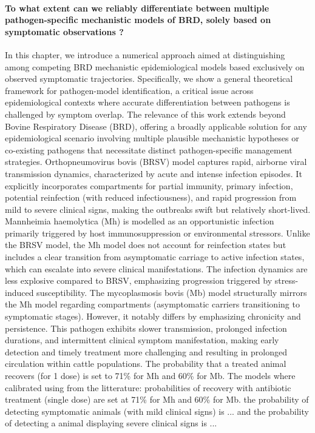 \paragraph{To what extent can we reliably differentiate between multiple pathogen-specific mechanistic models of BRD, solely based on symptomatic observations ?} In this chapter, we introduce a numerical approach aimed at distinguishing among competing BRD mechanistic epidemiological models \cite{sorindupont_modeling_2023} based exclusively on observed symptomatic trajectories. Specifically, we show a general theoretical framework for pathogen-model identification, a critical issue across epidemiological contexts where accurate differentiation between pathogens is challenged by symptom overlap. The relevance of this work extends beyond Bovine Respiratory Disease (BRD), offering a broadly applicable solution for any epidemiological scenario involving multiple plausible mechanistic hypotheses or co-existing pathogens that necessitate distinct pathogen-specific management strategies. Orthopneumovirus bovis (BRSV) model captures rapid, airborne viral transmission dynamics, characterized by acute and intense infection episodes. It explicitly incorporates compartments for partial immunity, primary infection, potential reinfection (with reduced infectiousness), and rapid progression from mild to severe clinical signs, making the outbreaks swift but relatively short-lived. Mannheimia haemolytica (Mh) is modelled as an opportunistic infection primarily triggered by host immunosuppression or environmental stressors. Unlike the BRSV model, the Mh model does not account for reinfection states but includes a clear transition from asymptomatic carriage to active infection states, which can escalate into severe clinical manifestations. The infection dynamics are less explosive compared to BRSV, emphasizing progression triggered by stress-induced susceptibility. The mycoplasmosis bovis (Mb) model structurally mirrors the Mh model regarding compartments (asymptomatic carriers transitioning to symptomatic stages). However, it notably differs by emphasizing chronicity and persistence. This pathogen exhibits slower transmission, prolonged infection durations, and intermittent clinical symptom manifestation, making early detection and timely treatment more challenging and resulting in prolonged circulation within cattle populations. The probability that a treated animal recovers (for 1 dose) is set to 71\% for  Mh and 60\% for Mb. The models where calibrated using from the litterature: probabilities of recovery with antibiotic treatment (single dose) are set at 71\% for Mh and 60\% for Mb. the probability of detecting symptomatic animals (with mild clinical signs) is ... and the probability of detecting a animal displaying severe clinical signs is ...


